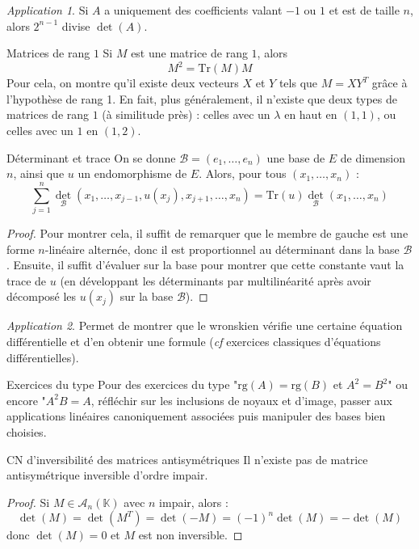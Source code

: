 \documentclass[french]{book}
\newcommand{\K}{\mathbb{K}}
\newcommand{\Tr}{\text{Tr}}
\theoremstyle{plain}
\theoremstyle{definition}
\theoremstyle{remark}
\newtheorem*{app}{Application}
\begin{document}
\begin{app}
	Si $A$ a uniquement des coefficients valant $-1$ ou $1$ et est de taille $n$, alors $2^{n-1}$ divise $\det(A)$. 
\end{app}
\begin{AS}{Matrices de rang $1$} Si $M$ est une matrice de rang $1$, alors $$M^2=\Tr(M)M$$ Pour cela, on montre qu'il existe deux vecteurs $X$ et $Y$ tels que $M=XY^T$ grâce à l'hypothèse de rang 1. En fait, plus généralement, il n'existe que deux types de matrices de rang $1$ (à similitude près) : celles avec un $\lambda$ en haut en $(1,1)$, ou celles avec un $1$ en $(1,2)$.
\end{AS}
\begin{AS}{Déterminant et trace} On se donne $\mathcal{B}=(e_1,\ldots,e_n)$ une base de $E$ de dimension $n$, ainsi que $u$ un endomorphisme de $E$. Alors, pour tous $(x_1,\ldots,x_n)$ : $$\sum_{j=1}^{n}\det_\mathcal{B}(x_1,\ldots,x_{j-1},u(x_j),x_{j+1},\ldots,x_n)=\Tr(u)\det_\mathcal{B}(x_1,\ldots,x_n)$$
\end{AS} \begin{proof}
Pour montrer cela, il suffit de remarquer que le membre de gauche est une forme $n$-linéaire alternée, donc il est proportionnel au déterminant dans la base $\mathcal{B}$. Ensuite, il suffit d'évaluer sur la base pour montrer que cette constante vaut la trace de $u$ (en développant les déterminants par multilinéarité après avoir décomposé les $u(x_j)$ sur la base $\mathcal{B}$).
\end{proof}
\begin{app}
	Permet de montrer que le wronskien vérifie une certaine équation différentielle et d'en obtenir une formule (\textit{cf} exercices classiques d'équations différentielles).
\end{app}
\begin{AS}{Exercices du type} Pour des exercices du type "$\text{rg}(A)=\text{rg}(B)$ et $A^2=B^2$" ou encore "$A^2B=A$, réfléchir sur les inclusions de noyaux et d'image, passer aux applications linéaires canoniquement associées puis manipuler des bases bien choisies.
\end{AS}
\begin{AS}{CN d'inversibilité des matrices antisymétriques}
	Il n'existe pas de matrice antisymétrique inversible d'ordre impair.
\end{AS}
\begin{proof}
	Si $M\in\mathcal{A}_n(\K)$ avec $n$ impair, alors : $$\det(M)=\det(M^T)=\det(-M)=(-1)^n\det(M)=-\det(M)$$ donc $\det(M)=0$ et $M$ est non inversible.
\end{proof}
\end{document}
